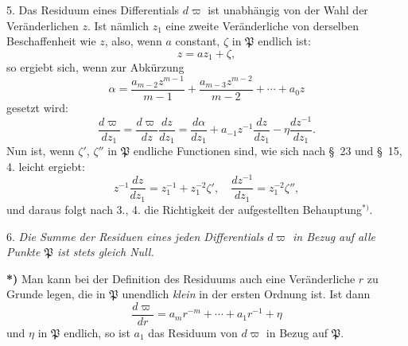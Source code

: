 \documentclass{article}
\begin{document}
5. Das Residuum eines Differentials $d\varpi$ ist unabhängig von der Wahl der Veränderlichen $z$. Ist nämlich $z_{1}$ eine zweite Veränderliche von derselben Beschaffenheit wie $z$, also, wenn $a$ constant, $\zeta$ in $\mathfrak{P}$ endlich ist:
\[ z = az_{1}+\zeta, \tag{2.} \]
so ergiebt sich, wenn zur Abkürzung
\[ \alpha = \frac{a_{m-2}z^{m-1}}{m-1}+\frac{a_{m-3}z^{m-2}}{m-2}+\cdots+a_{0}z \]
gesetzt wird:
\[ \frac{d\varpi}{dz_{1}} = \frac{d\varpi}{dz}\frac{dz}{dz_{1}} = \frac{d\alpha}{dz_{1}}+a_{-1}z^{-1}\frac{dz}{dz_{1}}-\eta\frac{dz^{-1}}{dz_{1}}. \]
Nun ist, wenn $\zeta'$, $\zeta''$ in $\mathfrak{P}$ endliche Functionen sind, wie sich nach §~23 und §~15, 4. leicht ergiebt:
\[ z^{-1}\frac{dz}{dz_{1}} = z_{1}^{-1}+z_{1}^{-2}\zeta', \quad \frac{dz^{-1}}{dz_{1}} = z_{1}^{-2}\zeta'', \]
und daraus folgt nach 3., 4. die Richtigkeit der aufgestellten Behauptung${}^{*)}$.

6. \emph{Die Summe der Residuen eines jeden Differentials $d\varpi$ in Bezug auf alle Punkte $\mathfrak{P}$ ist stets gleich Null.}

\textbf{*)} Man kann bei der Definition des Residuums auch eine Veränderliche $r$ zu Grunde legen, die in $\mathfrak{P}$ unendlich \emph{klein} in der ersten Ordnung ist. Ist dann
\[ \frac{d\varpi}{dr} = a_{m}r^{-m}+\cdots+a_{1}r^{-1}+\eta \]
und $\eta$ in $\mathfrak{P}$ endlich, so ist $a_{1}$ das Residuum von $d\varpi$ in Bezug auf $\mathfrak{P}$.

\end{document}
